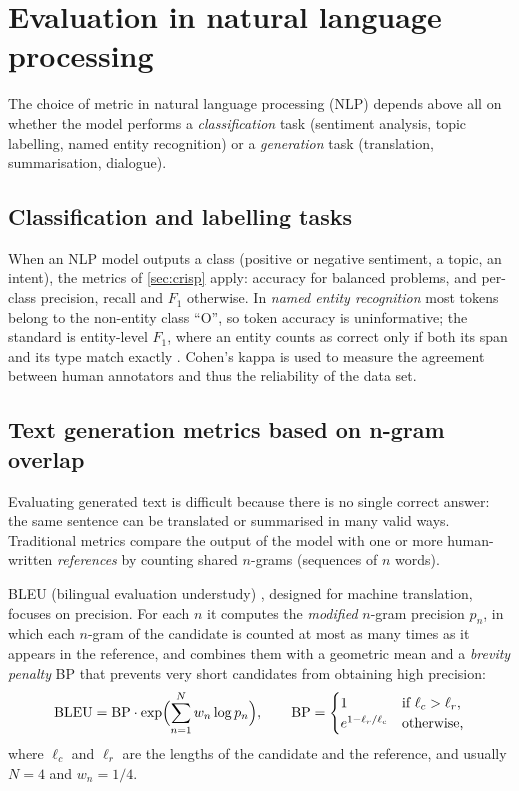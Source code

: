 \section{Evaluation in natural language processing\extsec}\label{sec:nlp}

The choice of metric in natural language processing (NLP) depends above all on whether the
model performs a \emph{classification} task (sentiment analysis, topic labelling, named entity
recognition) or a \emph{generation} task (translation, summarisation, dialogue).

\subsection{Classification and labelling tasks}

When an NLP model outputs a class (positive or negative sentiment, a topic, an intent), the
metrics of \cref{sec:crisp} apply: accuracy for balanced problems, and per-class precision,
recall and $F_1$ otherwise. In \emph{named entity recognition} most tokens belong to the
non-entity class ``O'', so token accuracy is uninformative; the standard is entity-level $F_1$,
where an entity counts as correct only if both its span and its type match exactly
\citep{tjong2003introduction}. Cohen's kappa is used to measure the agreement between human
annotators and thus the reliability of the data set.

\subsection{Text generation metrics based on n-gram overlap}

Evaluating generated text is difficult because there is no single correct answer: the same
sentence can be translated or summarised in many valid ways. Traditional metrics compare the
output of the model with one or more human-written \emph{references} by counting shared
$n$-grams (sequences of $n$ words).

BLEU (bilingual evaluation understudy) \citep{papineni2002bleu}, designed for machine translation, focuses on precision. For each
$n$ it computes the \emph{modified} $n$-gram precision $p_n$, in which each $n$-gram of the
candidate is counted at most as many times as it appears in the reference, and combines them
with a geometric mean and a \emph{brevity penalty} BP that prevents very short candidates from
obtaining high precision:
\begin{equation}
  \mathrm{BLEU}=\mathrm{BP}\cdot\exp\Bigl(\sum_{n=1}^{N}w_n\log p_n\Bigr),
  \qquad
  \mathrm{BP}=\begin{cases}1 & \text{if } \ell_c>\ell_r,\\ e^{1-\ell_r/\ell_c} & \text{otherwise,}\end{cases}
\end{equation}
where $\ell_c$ and $\ell_r$ are the lengths of the candidate and the reference, and usually
$N=4$ and $w_n=1/4$.

